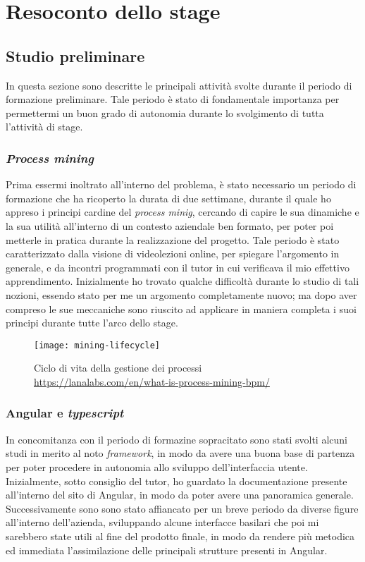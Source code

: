 
\chapter{Resoconto dello stage}
\label{cap:Resoconto dello stage}



\section{Studio preliminare}
In questa sezione sono descritte le principali attività svolte durante il periodo di formazione preliminare. Tale periodo è stato di fondamentale importanza per permettermi un buon grado di autonomia durante lo svolgimento di tutta l'attività di stage.
\subsection{\textit{Process mining}}
Prima essermi inoltrato all'interno del problema, è stato necessario un periodo di formazione che ha ricoperto la durata di due settimane, durante il quale ho appreso i principi cardine del \textit{process minig}, cercando di capire le sua dinamiche e la sua utilità all'interno di un contesto aziendale ben formato, per poter poi metterle in pratica durante la realizzazione del progetto. Tale periodo è stato caratterizzato dalla visione di videolezioni online, per spiegare l'argomento in generale, e da incontri programmati con il tutor in cui verificava il mio effettivo apprendimento. Inizialmente ho trovato qualche difficoltà durante lo studio di tali nozioni, essendo stato per me un argomento completamente nuovo; ma dopo aver compreso le sue meccaniche sono riuscito ad applicare in maniera completa i suoi principi durante tutte l'arco dello stage.
\begin{figure}[!h] 
	\centering 
	\texttt{[image: mining-lifecycle]} 
	\caption{Ciclo di vita della gestione dei processi \url{https://lanalabs.com/en/what-is-process-mining-bpm/}}
\end{figure}

\subsection{Angular e \textit{typescript}}
In concomitanza con il periodo di formazine sopracitato sono stati svolti alcuni studi in merito al noto \textit{framework}, in modo da avere una buona base di partenza per poter procedere in autonomia allo sviluppo dell'interfaccia utente. Inizialmente, sotto consiglio del tutor, ho guardato la documentazione presente all'interno del sito di Angular, in modo da poter avere una panoramica generale. Successivamente sono sono stato affiancato per un breve periodo da diverse figure all'interno dell'azienda, sviluppando alcune interfacce basilari che poi mi sarebbero state utili al fine del prodotto finale, in modo da rendere più metodica ed immediata l'assimilazione delle principali strutture presenti in Angular.
\newpage
